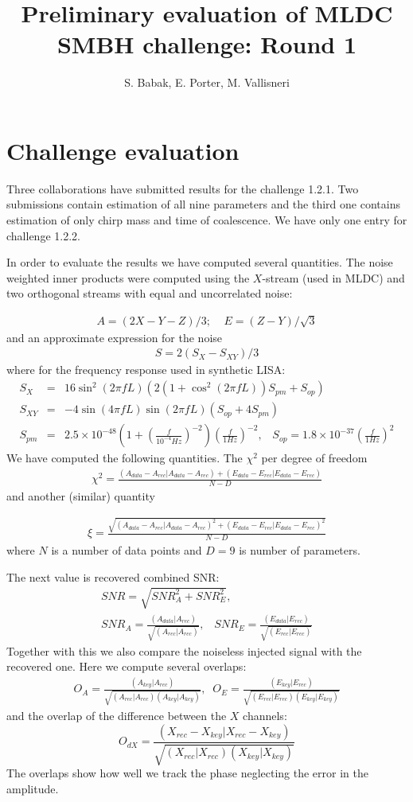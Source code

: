 \documentclass[prd,aps,amsfonts,amsmath, nofootinbib]{revtex4}
\def\be{\begin{equation}}
\def\en{\end{equation}}
\def\bea{\begin{eqnarray}}
\def\ena{\end{eqnarray}}
\begin{document}
\title{Preliminary evaluation of MLDC SMBH challenge: Round 1}
\author{S. Babak, E. Porter, M. Vallisneri}
\maketitle

\section{Challenge evaluation}

Three collaborations have submitted results for the challenge 1.2.1. Two submissions contain estimation of all nine parameters and the third one contains estimation of only chirp mass and time of coalescence.  We have only one entry for challenge 1.2.2.

In order to evaluate the results we have computed several quantities.  The noise weighted inner products were computed using the $X$-stream (used in MLDC) and two orthogonal streams with equal and uncorrelated noise:

\bea
A = (2X - Y - Z)/3; \;\;\;\; E = (Z - Y)/\sqrt{3}
\ena
and an approximate expression for the noise \bea
S = 2(S_X - S_{XY})/3
\ena
where for the frequency response used in synthetic LISA:
\bea
S_X &=& 16 \sin^2(2\pi fL)  (2 (1 + \cos^2(2\pi fL)) S_{pm} + S_{op})\\
S_{XY} &=& -4 \sin(4\pi fL)\sin(2\pi fL)  ( S_{op} + 4S_{pm} )\\
S_{pm} &=& 2.5\times10^{-48} \left(1 + \left(\frac{f}{10^{-4}Hz}\right)^{-2}
\right)  \left(\frac{f}{1Hz}\right)^{-2},\;\;\;
S_{op} = 1.8\times 10^{-37}  \left(\frac{f}{1Hz}\right)^2
\ena
We have computed the following quantities. The $\chi^2$ per degree
of freedom
\bea
\chi^{2} = \frac{(A_{data}- A_{rec}|A_{data}- A_{rec}) + 
(E_{data} - E_{rec}|E_{data} - E_{rec})}
{N-D}
\ena
and another (similar) quantity

\bea
\xi = \frac{\sqrt{(A_{data}- A_{rec}|A_{data}- A_{rec})^2 + 
(E_{data} - E_{rec}|E_{data} - E_{rec})^2}}
{N-D}
\ena
where $N$ is a number of data points and $D=9$ is number of parameters.

The next value is recovered combined SNR:
\bea
SNR  = \sqrt{SNR_A^2 + SNR_E^2},\\
SNR_A = \frac{(A_{data}|A_{rec})}{\sqrt{(A_{rec}|A_{rec})}},\;\;\;
SNR_E= \frac{(E_{data}|E_{rec})}{\sqrt{(E_{rec}|E_{rec})}}
\ena
Together with this we also compare the noiseless injected signal with 
the recovered one. Here we compute several overlaps:
\bea
O_A = \frac{(A_{key}|A_{rec})}{\sqrt{(A_{rec}|A_{rec})(A_{key}|A_{key})}}, \;\; 
O_E = \frac{(E_{key}|E_{rec})}{\sqrt{(E_{rec}|E_{rec})(E_{key}|E_{key})}}
\ena
and the overlap of the difference between the $X$ channels:
\be
O_{dX} = \frac{(X_{rec}-X_{key}|X_{rec}-X_{key})}
{\sqrt{(X_{rec}|X_{rec})(X_{key}|X_{key})}}
\en
The overlaps show how well we track the phase neglecting the error in 
the amplitude.
\end{document}
